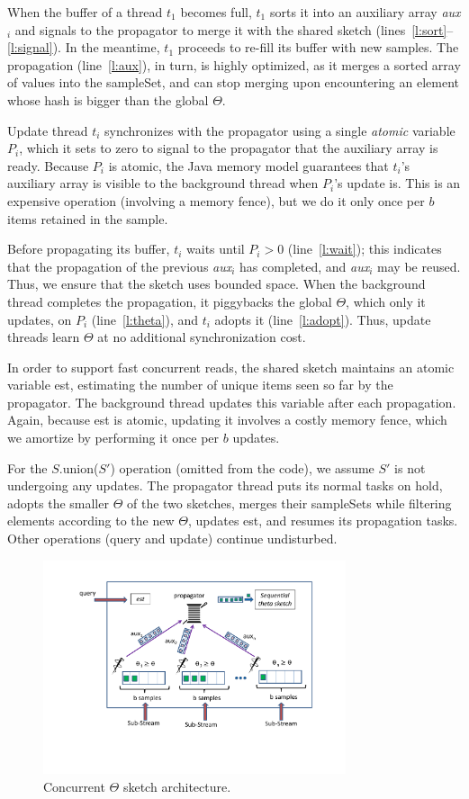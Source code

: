 When the buffer of a thread $t_1$ becomes full, $t_1$ sorts it
into an auxiliary array \emph{aux$_i$} and signals to the propagator  to merge
it with the shared sketch (lines~\ref{l:sort}--\ref{l:signal}).
In the meantime, $t_1$ proceeds to re-fill its buffer with new samples.
The propagation  (line~\ref{l:aux}), in turn,  is highly optimized, as it merges a sorted array of 
values into the sampleSet, and can stop merging upon encountering 
an element whose hash is bigger than the global $\Theta$.

Update thread $t_i$ synchronizes with the propagator using a 
single \emph{atomic} variable $P_i$, which it sets to zero 
to signal to the propagator that the auxiliary array is ready.  
Because $P_i$ is  atomic, the Java memory model
guarantees that $t_i$'s auxiliary array is visible to
the background thread when $P_i$'s update is.
This is  an expensive operation (involving a memory fence),  
but we do it only once per $b$ items retained in the sample.

Before propagating its buffer, $t_i$ waits
until $P_i > 0$  (line~\ref{l:wait}); 
this indicates that the propagation of the previous \emph{aux}$_i$
 has completed, and  \emph{aux}$_i$ may
be reused. Thus, we  ensure that the sketch uses bounded space.
%
When the background thread completes the propagation, 
it piggybacks the global $\Theta$, which only it updates, on $P_i$  (line~\ref{l:theta}), 
and $t_i$ adopts it  (line~\ref{l:adopt}). Thus, update threads   learn $\Theta$ at no
additional synchronization cost. 

In order to support  fast concurrent reads, the shared sketch
maintains an atomic variable est, estimating the number of
 unique items seen so far by the propagator.
The background thread updates this variable after each propagation.
Again, because est is atomic, updating it involves a costly memory fence, which we amortize by performing it once per $b$ updates. 

For the $S$.union($S'$) operation (omitted from the code), 
we assume $S'$ is not undergoing any updates. 
The propagator thread puts its normal tasks on hold, 
 adopts the smaller $\Theta$ of the two sketches, merges their sampleSets while filtering elements according to the new $\Theta$, updates est, and resumes its 
 propagation tasks. Other operations (query and update) continue undisturbed.


\begin{figure}[tb]
    \includegraphics[width=3.5in]{images/concTheta.pdf}
    \caption{Concurrent $\Theta$ sketch architecture.}
    \label{fig:concurrentTheta}
\end{figure}
